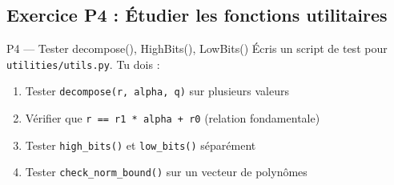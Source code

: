 \documentclass[12pt, a4paper]{article}
\begin{document}
\subsection{Exercice P4 : Étudier les fonctions utilitaires}

\begin{exercice}{P4 --- Tester decompose(), HighBits(), LowBits()}
Écris un script de test pour \texttt{utilities/utils.py}. Tu dois :
\begin{enumerate}
  \item Tester \texttt{decompose(r, alpha, q)} sur plusieurs valeurs
  \item Vérifier que \texttt{r == r1 * alpha + r0} (relation fondamentale)
  \item Tester \texttt{high\_bits()} et \texttt{low\_bits()} séparément
  \item Tester \texttt{check\_norm\_bound()} sur un vecteur de polynômes
\end{enumerate}
\end{exercice}
\end{document}
